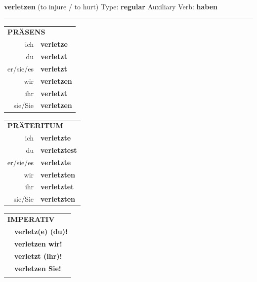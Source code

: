 \documentclass[10pt,a4paper]{revtex4-2}
\begin{document}
\begin{verbbox}
    {\Large \bf verletzen} (to injure / to hurt) \hfill Type: \textbf{regular} \hfill Auxiliary Verb: \textbf{haben} 
    
     \vspace{5pt}

    \hrule
    
    \vspace{5pt}

  \begin{tabular}{rl}
     \multicolumn{2}{l}{\textbf{PRÄSENS} }\\
    ich & \textbf{verletze}\\
    du & \textbf{verletzt}\\
    er/sie/es & \textbf{verletzt}\\
    wir & \textbf{verletzen}\\
    ihr & \textbf{verletzt}\\
    sie/Sie & \textbf{verletzen}\\
  \end{tabular}
  \hfill
     \begin{tabular}{rl}
    \multicolumn{2}{l}{\textbf{PRÄTERITUM} }\\
    ich & \textbf{verletzte}\\
    du & \textbf{verletztest}\\
    er/sie/es & \textbf{verletzte}\\
    wir & \textbf{verletzten}\\
    ihr & \textbf{verletztet}\\
    sie/Sie & \textbf{verletzten}\\
  \end{tabular}
  \hfill
  \begin{tabular}{rl}
     \multicolumn{2}{l}{\textbf{IMPERATIV} }\\
   & \textbf{verletz(e) (du)!}\\
   & \textbf{verletzen wir!}\\
   & \textbf{verletzt (ihr)!}\\
   & \textbf{verletzen Sie!}\\
   & \vspace{10pt}
  \end{tabular}

    \vspace{10pt}


\end{verbbox}
\end{document}
